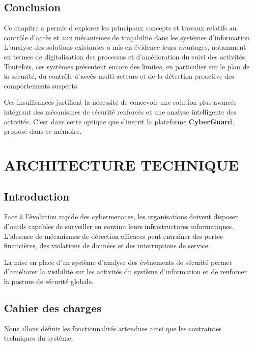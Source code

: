 \documentclass[a4paper,12pt]{report}
\begin{document}
   \section{Conclusion}
    
    Ce chapitre a permis d'explorer les principaux concepts et travaux relatifs au contrôle d'accès et aux mécanismes de traçabilité dans les systèmes d'information. L'analyse des solutions existantes a mis en évidence leurs avantages, notamment en termes de digitalisation des processus et d'amélioration du suivi des activités. Toutefois, ces systèmes présentent encore des limites, en particulier sur le plan de la sécurité, du contrôle d'accès multi-acteurs et de la détection proactive des comportements suspects.
    
    Ces insuffisances justifient la nécessité de concevoir une solution plus avancée intégrant des mécanismes de sécurité renforcés et une analyse intelligente des activités. C'est dans cette optique que s'inscrit la plateforme \textbf{CyberGuard}, proposé dans ce mémoire.
    
    \chapter{ARCHITECTURE TECHNIQUE}
    
    \section{Introduction}
    
    Face à l'évolution rapide des cybermenaces, les organisations doivent disposer d'outils capables de surveiller en continu leurs infrastructures informatiques. L'absence de mécanismes de détection efficaces peut entraîner des pertes financières, des violations de données et des interruptions de service.
    
    La mise en place d'un système d'analyse des évènements de sécurité permet d'améliorer la visibilité sur les activités du système d'information et de renforcer la posture de sécurité globale.
    
    \section{Cahier des charges}
    
    Nous allons définir les fonctionnalités attendues ainsi que les contraintes techniques du système.
    
\end{document}
